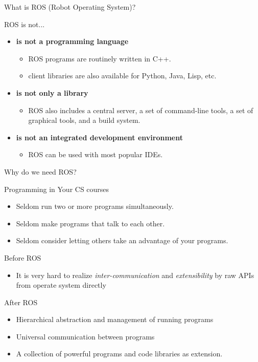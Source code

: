 \documentclass[10pt]{beamer}
\begin{document}
 \begin{frame}{What is ROS (Robot Operating System)?}
  \begin{block}{ROS is not...}
   \begin{itemize}
    \pause
    \item {\bf{is not a programming language}}
    \begin{itemize}
      \item ROS programs are routinely written in C++.
      \item client libraries are also available for Python, Java, Lisp, etc.
    \end{itemize}
    \pause
    \item {\bf{is not only a library}}
    \begin{itemize}
      \item ROS also includes a central server, a set of command-line tools, a set of graphical tools, and a build system.
    \end{itemize}
    \pause
    \item {\bf{is not an integrated development environment}}
    \begin{itemize}
      \item ROS can be used with most popular IDEs.
    \end{itemize}
   \end{itemize}   
  \end{block}
 \end{frame}

 
 \begin{frame}{Why do we need ROS?}
  \begin{block}{Programming in Your CS courses}
   \begin{itemize}
    \item Seldom run two or more programs simultaneously.
    \item Seldom make programs that talk to each other.
    \item Seldom consider letting others take an advantage of your programs.
   \end{itemize}
  \end{block}
  \pause
  \begin{block}{Before ROS}
   \begin{itemize}
    \item It is very hard to realize {\em{inter-communication}} and {\em{extensibility}} by raw APIs from operate system directly
   \end{itemize}
  \end{block}
  \pause
  \begin{block}{After ROS}
   \begin{itemize}
    \item Hierarchical abstraction and management of running programs
    \item Universal communication between programs
    \item A collection of powerful programs and code libraries as extension.
   \end{itemize}
  \end{block}
 \end{frame}
 
\end{document}

